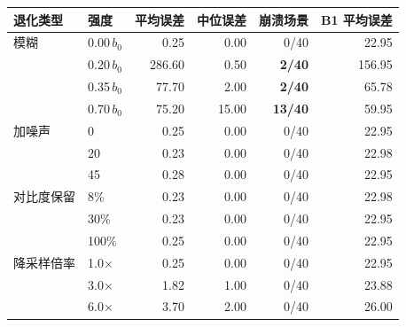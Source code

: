 \begin{tabular}{llrrrr}
\toprule
退化类型 & 强度 & 平均误差 & 中位误差 & 崩溃场景 & B1 平均误差 \\
\midrule
模糊 & 0.00$\,b_0$ & 0.25 & 0.00 & 0/40 & 22.95 \\
 & 0.20$\,b_0$ & 286.60 & 0.50 & \textbf{2/40} & 156.95 \\
 & 0.35$\,b_0$ & 77.70 & 2.00 & \textbf{2/40} & 65.78 \\
 & 0.70$\,b_0$ & 75.20 & 15.00 & \textbf{13/40} & 59.95 \\
\midrule
加噪声 & 0 & 0.25 & 0.00 & 0/40 & 22.95 \\
 & 20 & 0.23 & 0.00 & 0/40 & 22.98 \\
 & 45 & 0.28 & 0.00 & 0/40 & 22.95 \\
\midrule
对比度保留 & 8\% & 0.23 & 0.00 & 0/40 & 22.98 \\
 & 30\% & 0.23 & 0.00 & 0/40 & 22.95 \\
 & 100\% & 0.25 & 0.00 & 0/40 & 22.95 \\
\midrule
降采样倍率 & 1.0$\times$ & 0.25 & 0.00 & 0/40 & 22.95 \\
 & 3.0$\times$ & 1.82 & 1.00 & 0/40 & 23.88 \\
 & 6.0$\times$ & 3.70 & 2.00 & 0/40 & 26.00 \\
\bottomrule
\end{tabular}